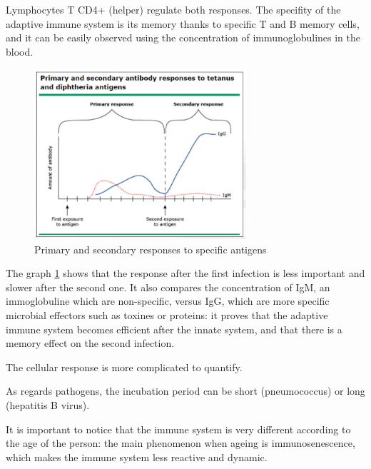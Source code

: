 \documentclass{article}
\begin{document}
\begin{itemize}
                        Lymphocytes T CD4+ (helper) regulate both responses.
                        The specifity of the adaptive immune system is its memory thanks to specific T and B memory cells, 
                            and it can be easily observed using the concentration of immunoglobulines in the blood.
                        
                            \begin{figure}
                                \centering
                                \includegraphics[width=0.7\textwidth]{imgs/PrimarySecondaryResponses.JPG}
                                \caption{Primary and secondary responses to specific antigens \autocite{pinkComparisonImmunityGeneral}}
                                \label{fig:responses}
                            \end{figure}

                        The graph \ref{fig:responses} shows that the response after the first infection is less important and slower after the second one.
                        It also compares the concentration of IgM, an immoglobuline which are non-specific, 
                            versus IgG, which are more specific microbial effectors such as toxines or proteins:
                            it proves that the adaptive immune system becomes efficient after the innate system, and that there is a memory effect on the second infection.                     

                        The cellular response is more complicated to quantify.

                        As regards pathogens, the incubation period can be short (pneumococcus) or long (hepatitis B virus).

                        It is important to notice that the immune system is very different according to the age of the person: the main phenomenon when ageing is immunosenescence,
                            which makes the immune system less reactive and dynamic.
                \end{itemize}
              
\end{document}
